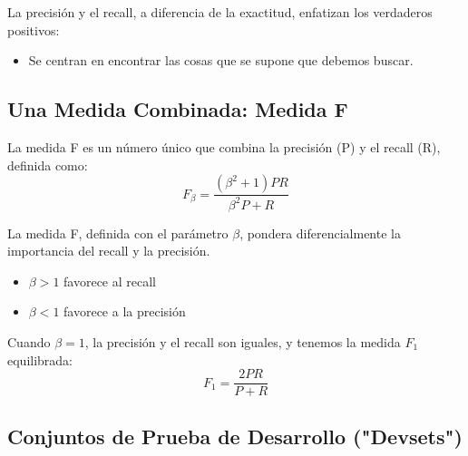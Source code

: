 \documentclass[11pt,fleqn]{book} %
\begin{document}
La precisión y el recall, a diferencia de la exactitud, enfatizan los verdaderos positivos:
\begin{itemize}
  \item Se centran en encontrar las cosas que se supone que debemos buscar.
\end{itemize}

\subsection{Una Medida Combinada: Medida F}
La medida F es un número único que combina la precisión (P) y el recall (R), definida como:
\[
F_\beta = \frac{(\beta^2+1)PR}{\beta^2P + R}
\]

La medida F, definida con el parámetro $\beta$, pondera diferencialmente la importancia del recall y la precisión.
\begin{itemize}
  \item $\beta > 1$ favorece al recall
  \item $\beta < 1$ favorece a la precisión
\end{itemize}

Cuando $\beta = 1$, la precisión y el recall son iguales, y tenemos la medida $F_1$ equilibrada:
\[
F_1 = \frac{2PR}{P + R}
\]

\subsection{Conjuntos de Prueba de Desarrollo ("Devsets")}
\end{document}
